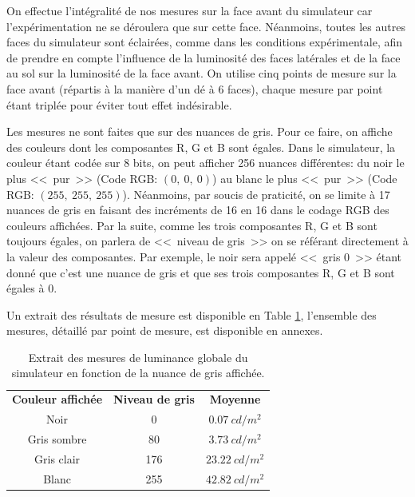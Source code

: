 	\par On effectue l'intégralité de nos mesures sur la face avant du simulateur car l'expérimentation ne se déroulera que sur cette face. Néanmoins, toutes les autres faces du simulateur sont éclairées, comme dans les conditions expérimentale, afin de prendre en compte l'influence de la luminosité des faces latérales et de la face au sol sur la luminosité de la face avant. On utilise cinq points de mesure sur la face avant (répartis à la manière d'un dé à 6 faces), chaque mesure par point étant triplée pour éviter tout effet indésirable.
	
	\par Les mesures ne sont faites que sur des nuances de gris. Pour ce faire, on affiche des couleurs dont les composantes R, G et B sont égales. Dans le simulateur, la couleur étant codée sur 8 bits, on peut afficher 256 nuances différentes: du noir le plus <<~pur~>> (Code RGB: $(0,~0,~0)$) au blanc le plus <<~pur~>> (Code RGB: $(255,~255,~255)$). Néanmoins, par soucis de praticité, on se limite à 17 nuances de gris en faisant des incréments de 16 en 16 dans le codage RGB des couleurs affichées. Par la suite, comme les trois composantes R, G et B sont toujours égales, on parlera de <<~niveau de gris~>> on se référant directement à la valeur des composantes. Par exemple, le noir sera appelé <<~gris 0~>> étant donné que c'est une nuance de gris et que ses trois composantes R, G et B sont égales à 0.
	
	\par Un extrait des résultats de mesure est disponible en Table \ref{tab:extrait_mesure_luminance_fond}, l'ensemble des mesures, détaillé par point de mesure, est disponible en annexes.
	
	\begin{table}[h]	
		\centering
		\caption{Extrait des mesures de luminance globale du simulateur en fonction de la nuance de gris affichée.}
		\label{tab:extrait_mesure_luminance_fond}
		\small
		\begin{tabular}{ccc}
			\textbf{Couleur affichée} & \textbf{Niveau de gris} & \textbf{Moyenne}\\
			Noir & 0 & $0.07~cd/m^2$\\
			Gris sombre & 80 & $3.73~cd/m^2$\\
			Gris clair & 176 & $23.22~cd/m^2$\\
			Blanc & 255 & $42.82~cd/m^2$
		\end{tabular}
	\end{table}
	
